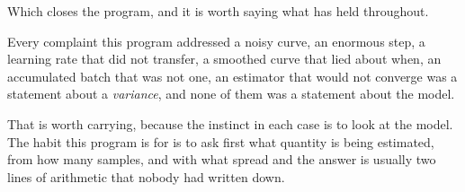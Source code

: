\begin{fr}
Which closes the program, and it is worth saying what has held throughout.

Every complaint this program addressed \dash{} a noisy curve, an enormous
step, a learning rate that did not transfer, a smoothed curve that lied about
when, an accumulated batch that was not one, an estimator that would not
converge \dash{} was a statement about a \emph{variance}, and none of them was
a statement about the model.

That is worth carrying, because the instinct in each case is to look at the
model. The habit this program is for is to ask first what quantity is being
estimated, from how many samples, and with what spread \dash{} and the answer
is usually two lines of arithmetic that nobody had written down.
\end{fr}

